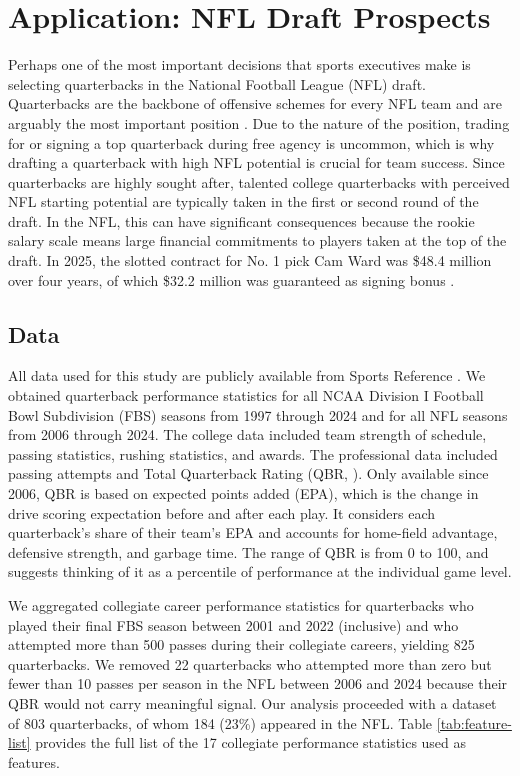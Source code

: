 \documentclass[Review, sageh, times, doublespace]{sagej}
\begin{document}
\section{Application: NFL Draft Prospects}

Perhaps one of the most important decisions that sports executives make is selecting quarterbacks in the National Football League (NFL) draft. Quarterbacks are the backbone of offensive schemes for every NFL team and are arguably the most important position \citep{hughes_positional_2015}. Due to the nature of the position, trading for or signing a top quarterback during free agency is uncommon, which is why drafting a quarterback with high NFL potential is crucial for team success. Since quarterbacks are highly sought after, talented college quarterbacks with perceived NFL starting potential are typically taken in the first or second round of the draft. In the NFL, this can have significant consequences because the rookie salary scale means large financial commitments to players taken at the top of the draft. In 2025, the slotted contract for No. 1 pick Cam Ward was \$48.4 million over four years, of which \$32.2 million was guaranteed as signing bonus \citep{badenhausen_nfl_2025}.

\subsection{Data}
\label{sec:data}

All data used for this study are publicly available from Sports Reference \citep{sports_reference_sports_2025}. We obtained quarterback performance statistics for all NCAA Division I Football Bowl Subdivision (FBS) seasons from 1997 through 2024 and for all NFL seasons from 2006 through 2024. The college data included team strength of schedule, passing statistics, rushing statistics, and awards. The professional data included passing attempts and Total Quarterback Rating (QBR, \citealp{burke_how_2016}). Only available since 2006, QBR is based on expected points added (EPA), which is the change in drive scoring expectation before and after each play. It considers each quarterback's share of their team's EPA and accounts for home-field advantage, defensive strength, and garbage time. The range of QBR is from 0 to 100, and \citet{burke_how_2016} suggests thinking of it as a percentile of performance at the individual game level.

  We aggregated collegiate career performance statistics for quarterbacks who played their final FBS season between 2001 and 2022 (inclusive) and who attempted more than 500 passes during their collegiate careers, yielding 825 quarterbacks. We removed 22 quarterbacks who attempted more than zero but fewer than 10 passes per season in the NFL between 2006 and 2024 because their QBR would not carry meaningful signal. Our analysis proceeded with a dataset of 803 quarterbacks, of whom 184 (23\%) appeared in the NFL. Table \ref{tab:feature-list} provides the full list of the 17 collegiate performance statistics used as features.
\end{document}
